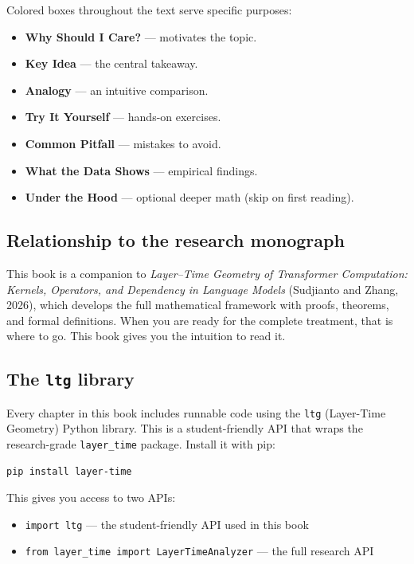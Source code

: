 \documentclass[11pt, twoside, openright]{memoir}
\begin{document}
Colored boxes throughout the text serve specific purposes:

\begin{itemize}[nosep]
\item {\color{Amber}\textbf{Why Should I Care?}} --- motivates the topic.
\item {\color{DGreen}\textbf{Key Idea}} --- the central takeaway.
\item {\color{Blue}\textbf{Analogy}} --- an intuitive comparison.
\item {\color{Teal}\textbf{Try It Yourself}} --- hands-on exercises.
\item {\color{DRed}\textbf{Common Pitfall}} --- mistakes to avoid.
\item {\color{DGreen}\textbf{What the Data Shows}} --- empirical findings.
\item {\color{DGray}\textbf{Under the Hood}} --- optional deeper math
  (skip on first reading).
\end{itemize}

\subsection*{Relationship to the research monograph}

This book is a companion to \emph{Layer--Time Geometry of Transformer
Computation: Kernels, Operators, and Dependency in Language Models}
(Sudjianto and Zhang, 2026), which develops the full mathematical framework
with proofs, theorems, and formal definitions. When you are ready for the
complete treatment, that is where to go. This book gives you the intuition
to read it.

\subsection*{The \texttt{ltg} library}

Every chapter in this book includes runnable code using the \texttt{ltg}
(Layer-Time Geometry) Python library. This is a student-friendly API that
wraps the research-grade \texttt{layer\_time} package. Install it with pip:
\begin{lstlisting}[caption={Install the layer-time package}]
pip install layer-time
\end{lstlisting}
This gives you access to two APIs:
\begin{itemize}[nosep]
\item \texttt{import ltg} --- the student-friendly API used in this book
\item \texttt{from layer\_time import LayerTimeAnalyzer} --- the full research API
\end{itemize}
\end{document}
